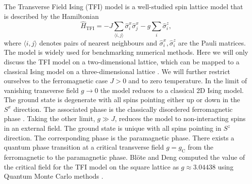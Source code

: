The Transverse Field Ising (TFI) model is a well-studied spin lattice model that is described by the Hamiltonian
\begin{equation}
	\label{eq:TFI_Hamiltonian}
	\hat{H}_\text{TFI} = -J\sum_{\langle i,j\rangle} \hat{\sigma}^x_i \hat{\sigma}^x_j - g\sum_{i} \hat{\sigma}^z_i,
\end{equation}
where $\langle i,j\rangle$ denotes pairs of nearest neighbours and $\hat{\sigma}^x_i, \hat{\sigma}^z_i$ are the Pauli matrices. The model is widely used for benchmarking numerical methods. Here we will only discuss the TFI model on a two-dimensional lattice, which can be mapped to a classical Ising model on a three-dimensional lattice \cite{cite:from_d_dimensional_quantum_to_dp1_dimensional_classical}. We will further restrict ourselves to the ferromagnetic case $J > 0$ and to zero temperature. In the limit of vanishing transverse field $g \rightarrow 0$ the model reduces to a classical 2D Ising model. The ground state is degenerate with all spins pointing either up or down in the $S^x$ direction. The associated phase is the classically disordered ferromagnetic phase \cite{cite:critical_behavior_of_the_two_dim_ising_model_in_transverse_field, cite:quantum_ising_phases_and_transitions_in_transverse_ising_models}. Taking the other limit, $g \gg J$, reduces the model to non-interacting spins in an external field. The ground state is unique with all spins pointing in $S^z$ direction. The corresponding phase is the paramagnetic phase. There exists a quantum phase transition at a critical transverse field $g = g_\text{C}$ from the ferromagnetic to the paramagnetic phase. Blöte and Deng computed the value of the critical field for the TFI model on the square lattice as $g \approx 3.04438$ using Quantum Monte Carlo methods \cite{cite:cluster_monte_carlo_simulation_of_TFI}. \par